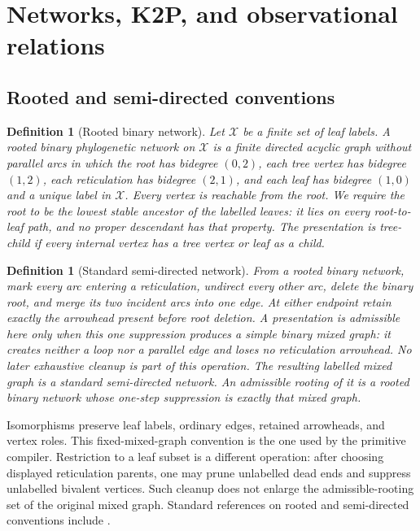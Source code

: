 \documentclass[11pt]{article}
\newtheorem{definition}[theorem]{Definition}
\theoremstyle{remark}
\newcommand{\X}{\mathcal X}
\newcommand{\1}{\mathbf 1}
\begin{document}
\section{Networks, K2P, and observational relations}\label{sec:definitions}

\subsection{Rooted and semi-directed conventions}

\begin{definition}[Rooted binary network]\label{def:rooted}
Let \(\X\) be a finite set of leaf labels.  A rooted binary phylogenetic
network on \(\X\) is a finite directed acyclic graph without parallel arcs in
which the root has bidegree \((0,2)\), each tree vertex has bidegree \((1,2)\),
each reticulation has bidegree \((2,1)\), and each leaf has bidegree \((1,0)\)
and a unique label in \(\X\).  Every vertex is reachable from the root.  We
require the root to be the lowest stable ancestor of the labelled leaves:
it lies on every root-to-leaf path, and no proper descendant has that
property.
The presentation is \emph{tree-child} if every internal vertex has a tree
vertex or leaf as a child.
\end{definition}

\begin{definition}[Standard semi-directed network]\label{def:semidirected}
From a rooted binary network, mark every arc entering a reticulation, undirect
every other arc, delete the binary root, and merge its two incident arcs into
one edge.  At either endpoint retain exactly the arrowhead present before root
deletion.  A presentation is admissible here only when this one suppression
produces a simple binary mixed graph: it creates neither a loop nor a parallel
edge and loses no reticulation arrowhead.  No later exhaustive cleanup is part
of this operation.  The resulting labelled mixed graph is a \emph{standard
semi-directed network}.  An \emph{admissible rooting} of it is a rooted binary
network whose one-step suppression is exactly that mixed graph.
\end{definition}

Isomorphisms preserve leaf labels, ordinary edges, retained arrowheads, and
vertex roles.  This fixed-mixed-graph convention is the one used by the
primitive compiler.  Restriction to a leaf subset is a different operation:
after choosing displayed reticulation parents, one may prune unlabelled dead
ends and suppress unlabelled bivalent vertices.  Such cleanup does not enlarge
the admissible-rooting set of the original mixed graph.  Standard references
on rooted and semi-directed conventions include
\cite{SempleSteel2003,HoltgrefeEtAl2026}.
\end{document}
